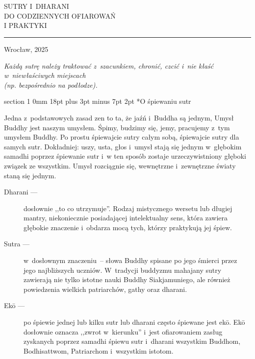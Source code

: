 \documentclass[12pt]{article}
\makeatletter
\def\data{2025}
\renewcommand{\section}{\@startsection%
 {section}			%
 {1}				%
 {0mm}				%
 {18pt plus 3pt minus 7pt}	%
 { 2pt}				%
 {\bfseries}}			%
\makeatother
\begin{document}
\setcounter{page}{-100}
\pagestyle{empty}

\begin{center}
\ \\
\vspace{2.5cm}
\ \\
{\LARGE
SUTRY I~DHARANI\\
\smallskip
DO CODZIENNYCH OFIAROWAŃ\\
\bigskip
I PRAKTYKI}

\vspace{9cm}
\rule{\textwidth}{1pt}
\vspace{1pt}
{\small Wrocław, \data}
\end{center}

\newpage

\null
\vspace{12cm}

\begin{center}
\it
Każdą sutrę należy traktować z~szacunkiem, chronić, czcić i~nie kłaść
w~niewłaściwych miejscach\\
(np. bezpośrednio na podłodze).
\end{center}
\newpage


\section*{O śpiewaniu sutr}

{
\parindent 0pt
\bigskip
Jedna z~podstawowych zasad zen to ta, że jaźń i~Buddha są jednym, Umysł
Buddhy jest naszym umysłem. Śpimy, budzimy się, jemy, pracujemy z~tym umysłem
Buddhy. Po prostu śpiewajcie sutry całym sobą, śpiewajcie sutry dla samych
sutr. Dokładniej: uszy, usta, głos i~umysł stają się jednym w~głębokim
samadhi poprzez śpiewanie sutr i~w ten sposób zostaje urzeczywistniony
głęboki związek ze wszystkim. Umysł rozciągnie się, wewnętrzne i~zewnętrzne
światy staną się jednym.

\begin{description}
	\item[Dharani ---]
	dosłownie ,,to co utrzymuje''. Rodzaj mistycznego wersetu lub
	długiej mantry, niekoniecznie posiadającej intelektualny sens, która
	zawiera głębokie znaczenie i~obdarza mocą tych, którzy praktykują
	jej śpiew.

	\item[Sutra ---]
	w~dosłownym znaczeniu~-- słowa Buddhy spisane po jego śmierci przez
	jego najbliższych uczniów. W~tradycji buddyzmu mahajany sutry
	zawierają nie tylko istotne nauki Buddhy Siakjamuniego, ale również
	powiedzenia wielkich patriarchów, gathy oraz dharani.

	\item[Ek\=o ---]
	po śpiewie jednej lub kilku sutr lub dharani często śpiewane jest
	ek\=o.  Ek\=o dosłownie oznacza ,,zwrot w~kierunku'' i~jest
	ofiarowaniem zasług zyskanych poprzez samadhi śpiewu sutr i~dharani
	wszystkim Buddhom, Bodhisattwom, Patriarchom i~wszystkim istotom.
\end{description}
}
\end{document}
